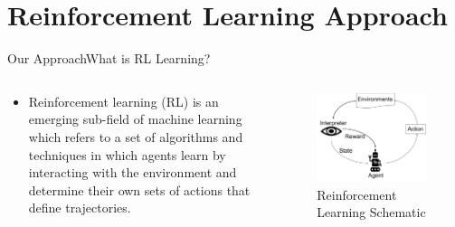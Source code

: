 \documentclass{beamer}
\begin{document}
\section{Reinforcement Learning Approach}
\begin{frame}{Our Approach}{What is RL Learning?}
\begin{columns}
\begin{column}{0.5\textwidth}
\begin{itemize}
\item Reinforcement learning (RL) is an emerging sub-field of
machine learning which refers to a set of algorithms and
techniques in which agents learn by interacting with the
environment and determine their own sets of actions that define
trajectories.
\end{itemize}
\end{column}
\begin{column}{0.5\textwidth}
\begin{figure}
\includegraphics[scale=0.25]{figs/img/Ref-L-agent.pdf}
\caption{Reinforcement Learning Schematic}
\end{figure}
\end{column}
\end{columns}
\end{frame}
\end{document}
